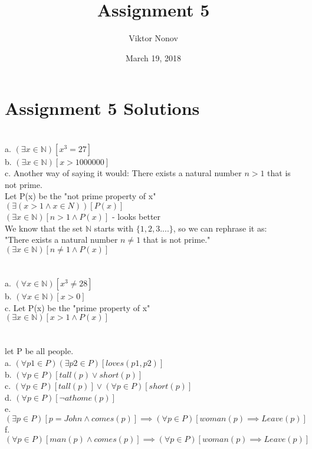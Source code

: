 \documentclass{article}
\title{Assignment 5}
\author{Viktor Nonov}
\date{March 19, 2018}
\begin{document}
\section*{Assignment 5 Solutions}

\section{}
a. $(\exists x \in \mathbb{N})[x^3 = 27]$ \\
b. $(\exists x \in \mathbb{N})[x > 1 000 000]$ \\
c.
Another way of saying it would: There exists a natural number $n > 1$ that is not prime. \\
Let P(x) be the "not prime property of x" \\
$(\exists(x > 1 \wedge x \in N))[P(x)]$ \\
$(\exists x \in \mathbb{N})[n > 1 \wedge P(x)]$ - looks better\\
We know that the set $\mathbb{N}$ starts with $\{1,2,3....\}$, so we can rephrase it as: \\
"There exists a natural number $n \neq 1$ that is not prime." \\
$(\exists x \in \mathbb{N})[n \neq 1 \wedge P(x)]$ \\

\section{}
a. $(\forall x \in \mathbb{N})[x^3 \neq 28]$ \\
b. $(\forall x \in \mathbb{N})[x > 0]$ \\
c. Let P(x) be the "prime property of x" \\
$(\exists x \in \mathbb{N})[x > 1 \wedge P(x)]$ \\

\section{}
let P be all people. \\
a. $(\forall p1 \in P)(\exists p2 \in P) [ loves(p1, p2) ]$ \\
b. $(\forall p \in P)[ tall(p) \vee short(p) ]$ \\
c. $(\forall p \in P)[ tall(p) ] \vee (\forall p \in P) [ short(p) ]$ \\
d. $(\forall p \in P)[ \neg athome(p) ]$ \\
e. $(\exists p \in P)[ p = John \wedge comes(p) ] \implies (\forall p \in P)[woman(p) \implies Leave(p)]$ \\
f. $(\forall p \in P)[man(p) \wedge comes(p)] \implies (\forall p \in P)[woman(p) \implies Leave(p)]$ \\
\end{document}
